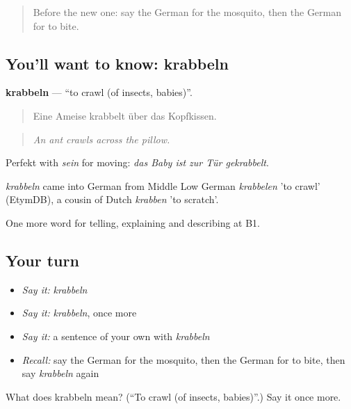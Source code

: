 \label{lesson:GE-C430-krabbeln}



\begin{quote}
Before the new one: say the German for the mosquito, then the German for to bite.
\end{quote}

\subsection*{You'll want to know: krabbeln}
\textbf{krabbeln} — \textquotedblleft{}to crawl (of insects, babies)\textquotedblright{}.

\begin{quote}
Eine Ameise krabbelt über das Kopfkissen.
\end{quote}

\begin{quote}
\emph{An ant crawls across the pillow.}
\end{quote}

Perfekt with \emph{sein} for moving: \emph{das Baby ist zur Tür gekrabbelt}.

\begin{cousinweb}
\emph{krabbeln} came into German from Middle Low German \emph{krabbelen} 'to crawl' (EtymDB), a cousin of Dutch \emph{krabben} 'to scratch'.
\end{cousinweb}

\begin{grammarlens}[title={What you've built}]
One more word for telling, explaining and describing at B1.
\end{grammarlens}

\subsection*{Your turn}
\begin{itemize}
\raggedright
  \item \emph{Say it:} \emph{krabbeln}
  \item \emph{Say it:} \emph{krabbeln}, once more
  \item \emph{Say it:} a sentence of your own with \emph{krabbeln}
  \item \emph{Recall:} say the German for the mosquito, then the German for to bite, then say \emph{krabbeln} again
\end{itemize}

\begin{tcolorbox}[breakable,colback=teal!4,colframe=teal!35!black,title={Before you move on}]
What does krabbeln mean? (\textquotedblleft{}To crawl (of insects, babies)\textquotedblright{}.) Say it once more.
\end{tcolorbox}
